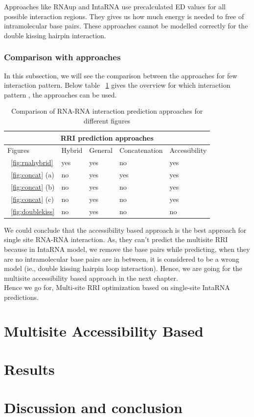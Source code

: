 \documentclass[twoside,a4paper]{report}
\begin{document}
	Approaches like RNAup and IntaRNA use precalculated ED values for all possible interaction regions. They gives us how much energy is needed to free of intramolecular base pairs. These approaches cannot be modelled correctly for the double kissing hairpin interaction.\\
	
	
	\subsection{Comparison with approaches}
	In this subsection, we will see the comparison between the approaches for few interaction pattern. Below table ~\ref{table:1} gives the overview for which interaction pattern , the approaches can be used. \\
	
	\begin{table}[H]
		\centering
	\begin{tabular}{ |p{3cm}||p{3cm}|p{3cm}|p{3cm}|p{3cm}|  }
		\hline
		\multicolumn{5}{|c|}{RRI prediction approaches} \\
		\hline
		Figures& Hybrid  &General  &Concatenation  &Accessibility \\
		\hline
		~\ref{fig:rnahybrid} &yes &yes &no &yes\\
		~\ref{fig:concat} (a) & no &yes &yes &yes \\
		~\ref{fig:concat} (b) & no &yes &no &yes \\
		~\ref{fig:concat} (c) & no &yes &no &yes \\
		~\ref{fig:doublekiss} &no &yes &no &no\\
		 \hline
	\end{tabular}
   \caption{ Comparison of RNA-RNA interaction prediction approaches for different figures}
   \label{table:1}
   \end{table}

	We could conclude that the accessibility based approach is the best approach for single site RNA-RNA interaction. As, they can't predict the multisite RRI because in IntaRNA model, we remove the base pairs while predicting, when they are no intramolecular base pairs are in between, it is considered to be a wrong model (ie., double kissing hairpin loop interaction). Hence, we are going for the multisite accessibility based approach in the next chapter.\\
	
	Hence we go for, Multi-site RRI optimization based on single-site IntaRNA predictions.\\
		
		
		
	\chapter{Multisite Accessibility Based  }
	\chapter{Results}
	\chapter{Discussion and conclusion}
	
	
	
	

	
\end{document}
